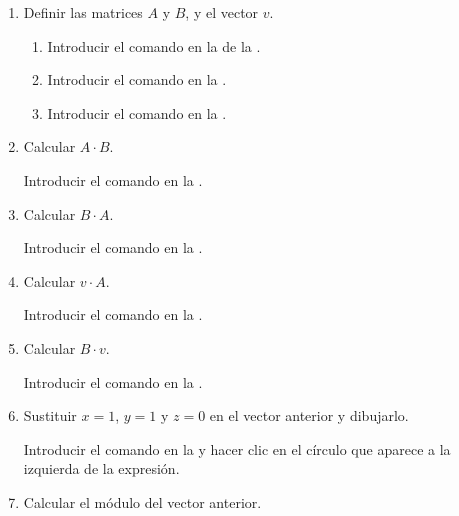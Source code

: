 \begin{enumerate}
      \begin{enumerate}
      \item Definir las matrices $A$ y $B$, y el vector $v$.
            \begin{indication}
            \begin{enumerate}
            \item Introducir el comando  en la  de la .
            \item Introducir el comando  en la .
            \item Introducir el comando  en la .
            \end{enumerate}
            \end{indication}
      \item Calcular $A\cdot B$.
            \begin{indication}
            Introducir el comando  en la .
            \end{indication}
      \item Calcular $B\cdot A$.
            \begin{indication}
            Introducir el comando  en la .
            \end{indication}
      \item Calcular $v\cdot A$.
            \begin{indication}
            Introducir el comando  en la .
            \end{indication}
      \item Calcular $B\cdot v$.
            \begin{indication}
            Introducir el comando  en la .
            \end{indication}
      \item Sustituir $x=1$, $y=1$ y $z=0$ en el vector anterior y dibujarlo.
            \begin{indication}
            Introducir el comando  en la  y hacer clic en el círculo que aparece a la izquierda de la expresión.
            \end{indication}
      \item Calcular el módulo del vector anterior.

\end{enumerate}
\end{enumerate}
